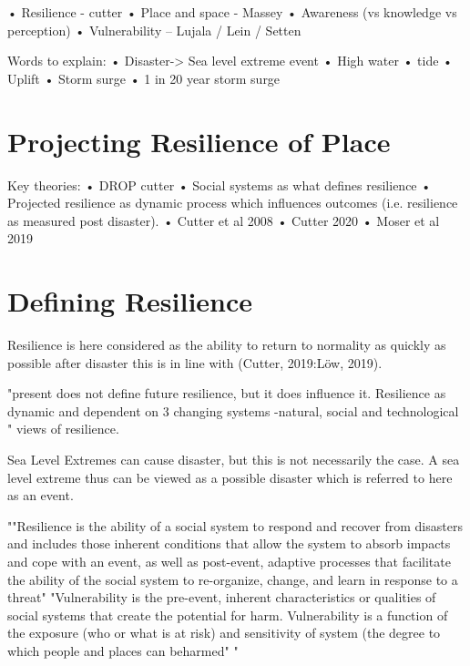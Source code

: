 \documentclass{article}
\begin{document}
•	Resilience - cutter
•	Place and space - Massey
•	Awareness (vs knowledge vs perception)
•	Vulnerability – Lujala / Lein / Setten 

Words to explain:
•	Disaster-> Sea level extreme event
•	High water
•	tide
•	Uplift
•	Storm surge
•	1 in 20 year storm surge

\section{Projecting Resilience of Place}
Key theories:
•	DROP cutter
•	Social systems as what defines resilience
•	Projected resilience as dynamic process which influences outcomes (i.e. resilience as measured post disaster). 
•	Cutter et al 2008
•	Cutter 2020 
•	Moser et al 2019 

\section{Defining Resilience} 
Resilience is here considered as the ability to return to normality as quickly as possible after disaster this is in line with (Cutter, 2019:Löw, 2019).

"present does not define future resilience, but it does influence it. Resilience as dynamic and dependent on 3 changing systems -natural, social and technological
" \cite{cutter_community_2020} views of resilience.

Sea Level Extremes can cause disaster, but this is not necessarily the case. A sea level extreme thus can be viewed as a possible disaster which is referred to here as an event. 

""Resilience is the ability of a social system to respond and recover from disasters and includes those inherent conditions that allow the system to absorb impacts and cope with an event, as well as post-event, adaptive processes that facilitate the ability of the social system to re-organize, change, and learn in response to a threat" "Vulnerability is the pre-event, inherent characteristics or qualities of social systems that create the potential for harm. Vulnerability is a function of the exposure (who or what is at risk) and sensitivity of system (the degree to which people and places can beharmed" " \cite{cutter_place-based_2008}
\end{document}

